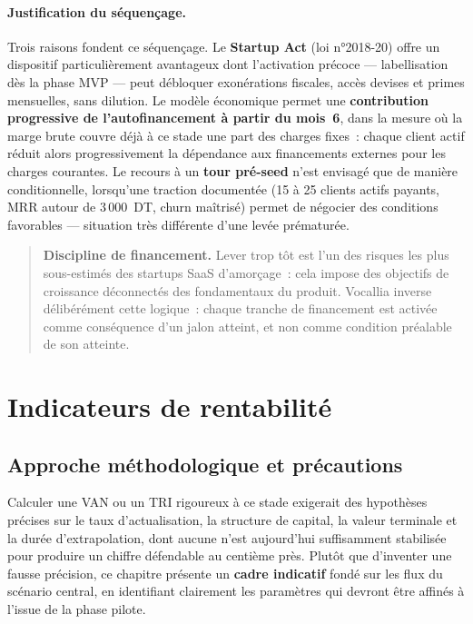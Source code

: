 \paragraph{Justification du séquençage.} Trois raisons fondent ce séquençage. Le \textbf{Startup Act} (loi n°2018-20) offre un dispositif particulièrement avantageux dont l'activation précoce — labellisation dès la phase MVP — peut débloquer exonérations fiscales, accès devises et primes mensuelles, sans dilution. Le modèle économique permet une \textbf{contribution progressive de l'autofinancement à partir du mois~6}, dans la mesure où la marge brute couvre déjà à ce stade une part des charges fixes~: chaque client actif réduit alors progressivement la dépendance aux financements externes pour les charges courantes. Le recours à un \textbf{tour pré-seed} n'est envisagé que de manière conditionnelle, lorsqu'une traction documentée (15 à 25 clients actifs payants, MRR autour de 3\,000~DT, churn maîtrisé) permet de négocier des conditions favorables — situation très différente d'une levée prématurée.

\begin{quote}
\textbf{Discipline de financement.} Lever trop tôt est l'un des risques les plus sous-estimés des startups SaaS d'amorçage~: cela impose des objectifs de croissance déconnectés des fondamentaux du produit. Vocallia inverse délibérément cette logique~: chaque tranche de financement est activée comme conséquence d'un jalon atteint, et non comme condition préalable de son atteinte.
\end{quote}

\section{Indicateurs de rentabilité}
\label{sec:indicateurs_rentabilite}

\subsection{Approche méthodologique et précautions}
\label{subsec:methodo_indicateurs}

Calculer une VAN ou un TRI rigoureux à ce stade exigerait des hypothèses précises sur le taux d'actualisation, la structure de capital, la valeur terminale et la durée d'extrapolation, dont aucune n'est aujourd'hui suffisamment stabilisée pour produire un chiffre défendable au centième près. Plutôt que d'inventer une fausse précision, ce chapitre présente un \textbf{cadre indicatif} fondé sur les flux du scénario central, en identifiant clairement les paramètres qui devront être affinés à l'issue de la phase pilote.

